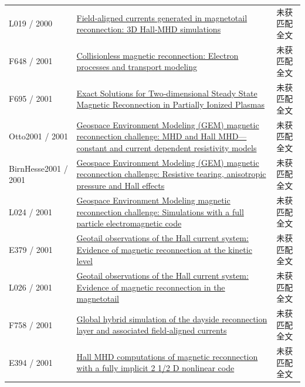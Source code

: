 \begin{longtable}{P{24mm}P{97mm}P{27mm}}
L019 / 2000 & \href{https://doi.org/10.1029/1999gl003688}{Field‐aligned currents generated in magnetotail reconnection: 3D Hall‐MHD simulations} & 未获匹配全文\\

F648 / 2001 & \href{https://doi.org/10.1029/1999ja001002}{Collisionless magnetic reconnection: Electron processes and transport modeling} & 未获匹配全文\\

F695 / 2001 & \href{https://doi.org/10.1086/319012}{Exact Solutions for Two‐dimensional Steady State Magnetic Reconnection in Partially Ionized Plasmas} & 未获匹配全文\\

Otto2001 / 2001 & \href{https://doi.org/10.1029/1999ja001005}{Geospace Environment Modeling (GEM) magnetic reconnection challenge: MHD and Hall MHD—constant and current dependent resistivity models} & 未获匹配全文\\

BirnHesse2001 / 2001 & \href{https://doi.org/10.1029/1999ja001001}{Geospace Environment Modeling (GEM) magnetic reconnection challenge: Resistive tearing,  anisotropic pressure and Hall effects} & 未获匹配全文\\

L024 / 2001 & \href{https://doi.org/10.1029/1999ja001006}{Geospace Environment Modeling magnetic reconnection challenge: Simulations with a full particle electromagnetic code} & 未获匹配全文\\

E379 / 2001 & \href{http://t2r2.star.titech.ac.jp/cgi-bin/publicationinfo.cgi?q_publication_content_number=CTT100469369}{Geotail observations of the Hall current system: Evidence of magnetic reconnection at the kinetic level} & 未获匹配全文\\

L026 / 2001 & \href{https://doi.org/10.1029/2001ja900038}{Geotail observations of the Hall current system: Evidence of magnetic reconnection in the magnetotail} & 未获匹配全文\\

F758 / 2001 & \href{https://doi.org/10.1029/2000ja000184}{Global hybrid simulation of the dayside reconnection layer and associated field‐aligned currents} & 未获匹配全文\\

E394 / 2001 & \href{http://ui.adsabs.harvard.edu/abs/2001AGUSM..SM31A06F/abstract}{Hall MHD computations of magnetic reconnection with a fully implicit 2 1/2 D nonlinear code} & 未获匹配全文\\


\end{longtable}
